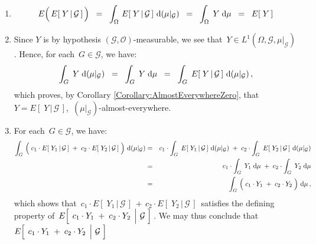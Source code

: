 \begin{enumerate}
\item
	\begin{equation*}
	E\!\left(\,\overset{{\color{white}.}}{E}\!\left[\;Y\,\vert\,\mathcal{G}\,\right]\,\right)
	\;\; = \;\;
		\int_{\Omega}\,\overset{{\color{white}.}}{E}\!\left[\;Y\,\vert\,\mathcal{G}\,\right]\,\d(\mu\vert_{\mathcal{G}})
	\;\; = \;\;
		\int_{\Omega}\;Y\;\d\mu
	\;\; = \;\;
		E\!\left[\;Y\,\right]
	\end{equation*}
\item
	Since $Y$ is by hypothesis $(\mathcal{G},\mathcal{O})$-measurable, we see that
	\,$Y \in L^{1}(\Omega,\mathcal{G},\mu\vert_{\mathcal{G}})$.
	Hence, for each \,$G \in \mathcal{G}$, we have:
	\begin{equation*}
	\int_{G}\;Y\;\textnormal{d}(\mu\vert_{\mathcal{G}})
	\;\; = \;\;
		\int_{G}\;Y\;\textnormal{d}\mu
	\;\; = \;\;
		\int_{G}\;E\!\left[\;Y\,\vert\,\mathcal{G}\,\right]\,\textnormal{d}(\mu\vert_{\mathcal{G}})\,,
	\end{equation*}
	which proves, by Corollary \ref{Corollary:AlmostEverywhereZero}, that
	\,$Y = E\!\left[\;Y\,\vert\,\mathcal{G}\,\right]$,\,
	$(\mu\vert_{\mathcal{G}})$-almost-everywhere.
\item
	For each \,$G \in \mathcal{G}$, we have:
	\begin{eqnarray*}
	\int_{G}\,\left(\;
		c_{1}\cdot E\!\left[\;Y_{1}\,\vert\,\mathcal{G}\,\right]
		\; \overset{{\color{white}.}}{+} \;
		c_{2}\cdot E\!\left[\;Y_{2}\,\vert\,\mathcal{G}\,\right]	
		\;\right)\,\d(\mu\vert_{\mathcal{G}})
	&=&
		c_{1} \cdot \int_{G}\;
			E\!\left[\;Y_{1}\,\vert\,\mathcal{G}\,\right]
			\,\d(\mu\vert_{\mathcal{G}})
		\; \overset{{\color{white}.}}{+} \;
		c_{2} \cdot \int_{G}\;
			E\!\left[\;Y_{2}\,\vert\,\mathcal{G}\,\right]	
			\,\d(\mu\vert_{\mathcal{G}})
	\\
	&=&
		c_{1} \cdot \int_{G}\;
			Y_{1}
			\;\d\mu
		\; \overset{{\color{white}.}}{+} \;
		c_{2} \cdot \int_{G}\;
			Y_{2}
			\;\d\mu
	\\
	&=&
		 \int_{G}\,\left(\;
			c_{1} \cdot Y_{1}
			\; \overset{{\color{white}.}}{+} \;
			c_{2} \cdot Y_{2}
			\;\right)\,\d\mu\,,
	\end{eqnarray*}
	which shows that
	\,$c_{1}\cdot E\!\left[\;Y_{1}\,\vert\,\mathcal{G}\,\right] \,+\, c_{2}\cdot E\!\left[\;Y_{2}\,\vert\,\mathcal{G}\,\right]$\,
	satisfies the defining property of 
	\,$E\!\left[\;\left.c_{1}\cdot Y_{1}\;\overset{{\color{white}.}}{+}\;c_{2}\cdot Y_{2}\,\;\right\vert\,\mathcal{G}\;\right]$\,.
	We may thus conclude that
	\,$E\!\left[\;\left.c_{1}\cdot Y_{1}\;\overset{{\color{white}.}}{+}\;c_{2}\cdot Y_{2}\,\;\right\vert\,\mathcal{G}\;\right]$

\end{enumerate}
